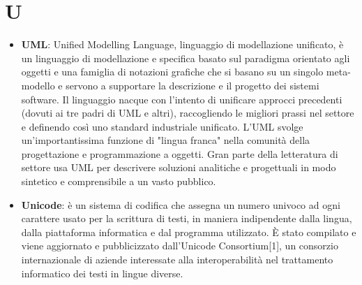\section{U}
\begin{itemize} 
	\item
	\textbf{UML}: Unified Modelling Language, linguaggio di modellazione unificato, è un linguaggio di modellazione e specifica basato sul paradigma orientato agli oggetti e una famiglia di notazioni grafiche che si basano su un singolo meta-modello e servono a supportare la descrizione e il progetto dei sistemi software.  Il linguaggio nacque con l'intento di unificare approcci precedenti (dovuti ai tre padri di UML e altri), raccogliendo le migliori prassi nel settore e definendo così uno standard industriale unificato.
	L'UML svolge un'importantissima funzione di "lingua franca" nella comunità della progettazione e programmazione a oggetti. Gran parte della letteratura di settore usa UML per descrivere soluzioni analitiche e progettuali in modo sintetico e comprensibile a un vasto pubblico.
	\item
	\textbf{Unicode}: è un sistema di codifica che assegna un numero univoco ad ogni carattere usato per la scrittura di testi, in maniera indipendente dalla lingua, dalla piattaforma informatica e dal programma utilizzato.
	È stato compilato e viene aggiornato e pubblicizzato dall'Unicode Consortium[1], un consorzio internazionale di aziende interessate alla interoperabilità nel trattamento informatico dei testi in lingue diverse.
\end{itemize}